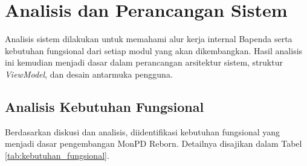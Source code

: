 \section{Analisis dan Perancangan Sistem}
\label{sec:analisisperancangansistem}

Analisis sistem dilakukan untuk memahami alur kerja internal Bapenda serta kebutuhan fungsional dari setiap modul yang akan dikembangkan. Hasil analisis ini kemudian menjadi dasar dalam perancangan arsitektur sistem, struktur \emph{ViewModel}, dan desain antarmuka pengguna.

\subsection{Analisis Kebutuhan Fungsional}
Berdasarkan diskusi dan analisis, diidentifikasi kebutuhan fungsional yang menjadi dasar pengembangan MonPD Reborn. Detailnya disajikan dalam Tabel \ref{tab:kebutuhan_fungsional}.

\renewcommand{\arraystretch}{1.5}

